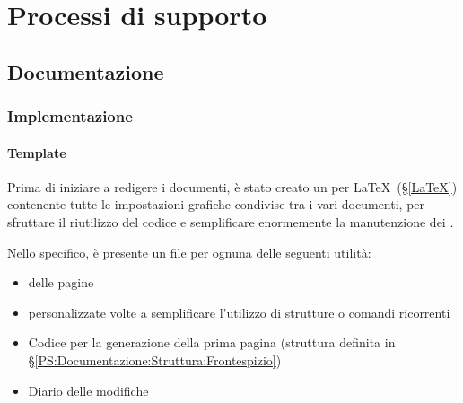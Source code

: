 
\section{Processi di supporto}\label{PS}

	\subsection{Documentazione}\label{PS:Documentazione}


		\subsubsection{Implementazione}\label{PS:Documentazione:Implementazione}

			\paragraph{Template}\label{PS:Documentazione:Implementazione:Template}
			Prima di iniziare a redigere i documenti, è stato creato un  per \LaTeX \ (\S\ref{LaTeX})
			contenente tutte le impostazioni grafiche condivise tra i vari documenti, per sfruttare il riutilizzo
			del codice e semplificare enormemente la manutenzione dei .\par
			Nello specifico, è presente un file per ognuna delle seguenti utilità:
			\begin{itemize}
				\item {} delle pagine
				\item {} personalizzate volte a semplificare l'utilizzo di strutture o comandi ricorrenti
				\item Codice per la generazione della prima pagina
					(struttura definita in \S\ref{PS:Documentazione:Struttura:Frontespizio})
				\item Diario delle modifiche
			\end{itemize}


